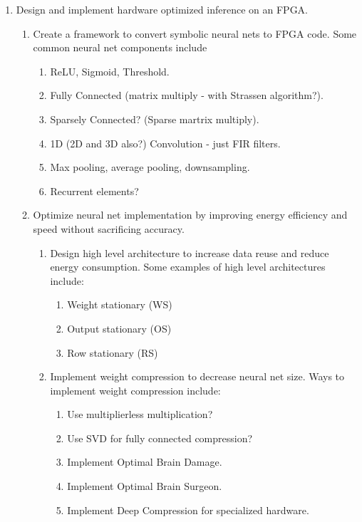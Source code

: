\documentclass[12pt]{article}
\begin{document}
  \begin{enumerate}
  \item Design and implement hardware optimized inference on an FPGA.
    \begin{enumerate}
      \item Create a framework to convert symbolic neural nets to FPGA code. Some common neural net components include
        \begin{enumerate}
          \item ReLU, Sigmoid, Threshold.
          \item Fully Connected (matrix multiply - with Strassen algorithm?).
          \item Sparsely Connected? (Sparse martrix multiply).
          \item 1D (2D and 3D also?) Convolution - just FIR filters.
          \item Max pooling, average pooling, downsampling.
          \item Recurrent elements?
        \end{enumerate}
      \item Optimize neural net implementation by improving energy efficiency and speed without sacrificing accuracy. 
      \begin{enumerate}
        \item Design high level architecture to increase data reuse and reduce energy consumption. Some examples of high level architectures include:
          \begin{enumerate}
              \item Weight stationary (WS)
              \item Output stationary (OS)
              \item Row stationary (RS)
          \end{enumerate}
        \item Implement weight compression to decrease neural net size. Ways to implement weight compression include:
          \begin{enumerate}
            \item Use multiplierless multiplication?
            \item Use SVD for fully connected compression?
            \item Implement Optimal Brain Damage.
            \item Implement Optimal Brain Surgeon.
            \item Implement Deep Compression for specialized hardware.

\end{enumerate}
\end{enumerate}
\end{enumerate}
\end{enumerate}
\end{document}
